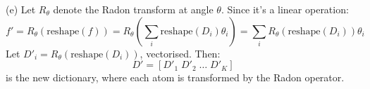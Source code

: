 \documentclass{article}
\begin{document}
\noindent (e) Let $R_\theta$ denote the Radon transform at angle $\theta$. Since it's a linear operation:
    \[
    f' = R_\theta(\text{reshape}(f)) = R_\theta \left( \sum_i \text{reshape}(D_i) \theta_i \right)
    = \sum_i R_\theta(\text{reshape}(D_i)) \theta_i
    \]
    Let $D'_i = R_\theta(\text{reshape}(D_i))$, vectorised. Then:
    \[
    D' = [D'_1 \; D'_2 \; \dots \; D'_K]
    \]
    is the new dictionary, where each atom is transformed by the Radon operator.
\end{document}
